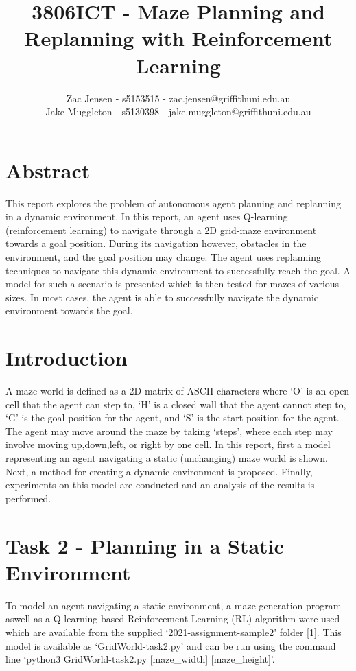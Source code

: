 \documentclass{article}
\title{3806ICT - Maze Planning and Replanning with Reinforcement Learning}
\author{Zac Jensen - s5153515 - zac.jensen@griffithuni.edu.au \\
    Jake Muggleton - s5130398 - jake.muggleton@griffithuni.edu.au}
\begin{document}
    \maketitle


    \section{Abstract}\label{sec:abstract}
        This report explores the problem of autonomous agent planning and replanning in a dynamic environment. In this report, an agent uses Q-learning (reinforcement learning) to navigate through a 2D grid-maze environment towards a goal position. During its navigation however, obstacles in the environment, and the goal position may change. The agent uses replanning techniques to navigate this dynamic environment to successfully reach the goal. A model for such a scenario is presented which is then tested for mazes of various sizes. In most cases, the agent is able to successfully navigate the dynamic environment towards the goal. 

    \section{Introduction}\label{sec:introduction}
        A maze world is defined as a 2D matrix of ASCII characters where ‘O’ is an open cell that the agent can step to, ‘H’ is a closed wall that the agent cannot step to, ‘G’ is the goal position for the agent, and ‘S’ is the start position for the agent. The agent may move around the maze by taking ‘steps’, where each step may involve moving up,down,left, or right by one cell. In this report, first a model representing an agent navigating a static (unchanging) maze world is shown. Next, a method for creating a dynamic environment is proposed. Finally, experiments on this model are conducted and an analysis of the results is performed.

    \section{Task 2 - Planning in a Static Environment}\label{sec:test-design}
        To model an agent navigating a static environment, a maze generation program aswell as a Q-learning based Reinforcement Learning (RL) algorithm were used which are available from the supplied ‘2021-assignment-sample2’ folder [1]. This model is available as ‘GridWorld-task2.py’ and can be run using the command line ‘python3 GridWorld-task2.py [maze\_width] [maze\_height]’.
\end{document}
